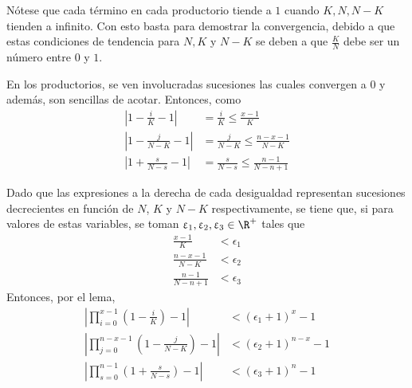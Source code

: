 \begin{Demo}
  Nótese que cada término en cada productorio tiende a $1$ cuando $K,N,N-K$
  tienden a infinito. Con esto basta para demostrar la convergencia, debido a que
  estas condiciones de tendencia para $N,K$ y $N-K$ se deben a que
  $\frac{K}{N}$ debe ser un número entre $0$ y $1$.

  En los productorios, se ven involucradas sucesiones las cuales convergen
  a $0$ y además, son sencillas de acotar. Entonces, como
  \begin{align*}
    \left|1 - \frac{i}{K} - 1\right| &= \frac{i}{K} \leq \frac{x-1}{K}\\[10pt]
    \left|1 - \frac{j}{N-K} - 1\right| &= \frac{j}{N-K} \leq \frac{n-x-1}{N-K}\\[10pt]
    \left|1 + \frac{s}{N-s} - 1\right| &= \frac{s}{N-s} \leq \frac{n-1}{N-n+1}
  \end{align*}
  
  Dado que las expresiones a la derecha de cada desigualdad representan sucesiones
  decrecientes en función de $N$, $K$ y $N-K$ respectivamente, se tiene que, si para
  valores de estas variables, se toman $\epsilon_1, \epsilon_2, \epsilon_3\in\R^+$
  tales que
  \begin{align*}
    \frac{x-1}{K}     &< \epsilon_1\\
    \frac{n-x-1}{N-K} &< \epsilon_2\\
    \frac{n-1}{N-n+1} &< \epsilon_3
  \end{align*}
  Entonces, por el lema,
  \begin{align*}
    \left|\prod_{i=0}^{x-1}\left(1-\frac{i}{K}\right) - 1\right| 
    &< (\epsilon_1 + 1)^x - 1\\[10pt]
    \left|\prod_{j=0}^{n-x-1}\left(1 - \frac{j}{N-K}\right) - 1\right|
    &< (\epsilon_2 + 1)^{n-x} - 1\\[10pt]
    \left|\prod_{s=0}^{n-1}\left(1 + \frac{s}{N-s}\right) - 1\right|
    &< (\epsilon_3 + 1)^n - 1
  \end{align*}


\end{Demo}
